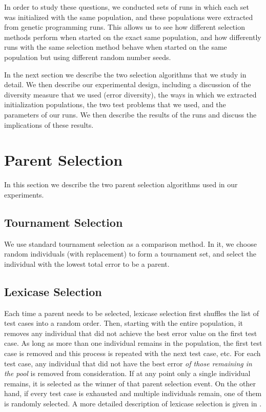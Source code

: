 \documentclass{sig-alternate-05-2015}
\begin{document}
In order to study these questions, we conducted sets of runs in which each set was initialized with the same population, and these populations were extracted from genetic programming runs. This allows us to see how different selection methods perform when started on the exact same population, and how differently runs with the same selection method behave when started on the same population but using different random number seeds.

In the next section we describe the two selection algorithms that we study in detail. We then describe our experimental design, including a discussion of the diversity measure that we used (error diversity), the ways in which we extracted initialization populations, the two test problems that we used, and the parameters of our runs. We then describe the results of the runs and discuss the implications of these results.





\section{Parent Selection}

In this section we describe the two parent selection algorithms used in our experiments.

\subsection{Tournament Selection}

We use standard tournament selection as a comparison method. In it, we choose random individuals (with replacement) to form a tournament set, and select the individual with the lowest total error to be a parent.

%

\subsection{Lexicase Selection}

Each time a parent needs to be selected, lexicase selection first shuffles the list of test cases into a random order. Then, starting with the entire population, it removes any individual that did not achieve the best error value on the first test case. As long as more than one individual remains in the population, the first test case is removed and this process is repeated with the next test case, etc. For each test case, any individual that did not have the best error \textit{of those remaining in the pool} is removed from consideration. If at any point only a single individual remains, it is selected as the winner of that parent selection event. On the other hand, if every test case is exhausted and multiple individuals remain, one of them is randomly selected. A more detailed description of lexicase selection is given in \cite{Helmuth:2015:ieeeTEC}.
\end{document}
